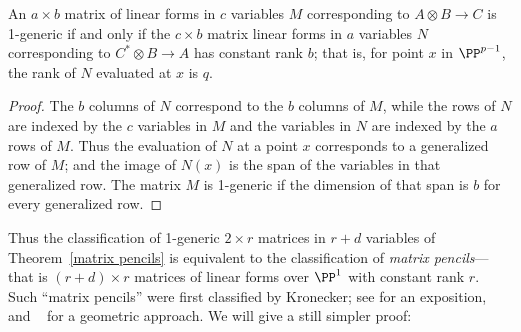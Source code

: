 \begin{proposition}\label{reinterpretation of 1-generic}
An  $a\times b$ matrix of linear forms in $c$ variables $M$ corresponding to $A\otimes B \to C$ is 1-generic if and only if the $c \times b$ matrix linear forms in $a$ variables $N$ corresponding to $C^{*}\otimes B \to A$ has constant rank $b$; that is, 
for point $x$ in $\PP^{p-1}$, the rank of $N$ evaluated at $x$ is $q$.
\end{proposition}

\begin{proof}
The $b$ columns of $N$ correspond to the $b$ columns of $M$, while the rows of $N$ are indexed
by the $c$ variables in $M$ and the variables in $N$ are indexed by the $a$ rows of $M$. Thus the
evaluation of $N$ at a point $x$ corresponds to a generalized row of $M$; and the image of $N(x)$
is the span of the variables in that generalized row. The matrix $M$ is 1-generic if the dimension
of that span is $b$ for every generalized row.
\end{proof}

Thus the classification of 1-generic $2\times r$ matrices in $r+d$ variables of Theorem~\ref{matrix pencils} is equivalent to the classification
of \emph{matrix pencils}---that is $(r+d)\times r$ matrices of linear forms over $\PP^{1}$ with constant rank $r$.
Such ``matrix pencils'' were first classified by Kronecker; see 
\cite[Vol. II, Chapter 12]{Gantmacher} for an exposition, and ~\cite{Eisenbud-Harris-Centennial} for a geometric approach.
We will give a still simpler proof:

